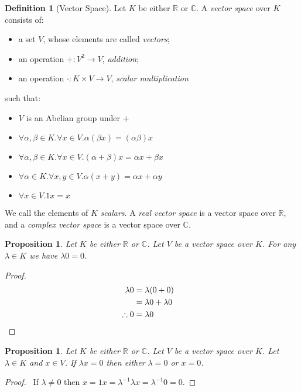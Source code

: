 \documentclass{book}
\let\qed\relax
\newtheorem{prop}[ax]{Proposition}
\theoremstyle{definition}
\newtheorem{df}[ax]{Definition}
\begin{document}
\begin{df}[Vector Space]
Let $K$ be either $\mathbb{R}$ or $\mathbb{C}$. A \emph{vector space} over $K$ consists of:
\begin{itemize}
\item a set $V$, whose elements are called \emph{vectors};
\item an operation $+ : V^2 \rightarrow V$, \emph{addition};
\item an operation $\cdot : K \times V \rightarrow V$, \emph{scalar multiplication}
\end{itemize}
such that:
\begin{itemize}
\item $V$ is an Abelian group under $+$
\item $\forall \alpha, \beta \in K. \forall x \in V. \alpha (\beta x) = (\alpha \beta) x$
\item $\forall \alpha, \beta \in K. \forall x \in V. (\alpha + \beta) x = \alpha x + \beta x$
\item $\forall \alpha \in K. \forall x,y \in V. \alpha (x + y) = \alpha x + \alpha y$
\item $\forall x \in V. 1x = x$
\end{itemize}

We call the elements of $K$ \emph{scalars}. A \emph{real vector space} is a vector space over $\mathbb{R}$, and a \emph{complex vector space} is a vector space over $\mathbb{C}$.
\end{df}

\begin{prop}
Let $K$ be either $\mathbb{R}$ or $\mathbb{C}$. Let $V$ be a vector space over $K$. For any $\lambda \in K$ we have $\lambda 0 = 0$.
\end{prop}

\begin{proof}
\pf\
\begin{align*}
\lambda 0 & = \lambda (0 + 0) \\
& = \lambda 0 + \lambda 0 \\
\therefore 0 & = \lambda 0 & \qed
\end{align*}
\end{proof}

\begin{prop}
Let $K$ be either $\mathbb{R}$ or $\mathbb{C}$. Let $V$ be a vector space over $K$. Let $\lambda \in K$ and $x \in V$. If $\lambda x = 0$ then either $\lambda = 0$ or $x = 0$.
\end{prop}

\begin{proof}
\pf\ If $\lambda \neq 0$ then $x = 1x = \lambda^{-1} \lambda x = \lambda^{-1} 0 = 0$. \qed
\end{proof}
\end{document}
